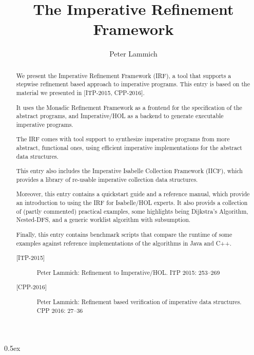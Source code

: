 \documentclass[11pt,a4paper]{report}
\begin{document}
\title{The Imperative Refinement Framework} 

\author{Peter Lammich}
\maketitle

\begin{abstract}
  We present the Imperative Refinement Framework (IRF), a tool that supports a
  stepwise refinement based approach to imperative programs. This entry is
  based on the material we presented in [ITP-2015, CPP-2016].

  It uses the Monadic Refinement Framework as a frontend for the specification of 
  the abstract programs, and Imperative/HOL as a backend to generate executable 
  imperative programs. 

  The IRF comes with tool support to synthesize 
  imperative programs from more abstract, functional ones, using efficient 
  imperative implementations for the abstract data structures.

  This entry also includes the Imperative Isabelle Collection Framework (IICF), which 
  provides a library of re-usable imperative collection data structures.

  Moreover, this entry contains a quickstart guide and a reference manual, which provide
  an introduction to using the IRF for Isabelle/HOL experts. 
  It also provids a collection of (partly commented) practical examples,
  some highlights being Dijkstra's Algorithm, Nested-DFS, and a generic worklist algorithm 
  with subsumption.

  Finally, this entry contains benchmark scripts that compare the runtime of some examples
  against reference implementations of the algorithms in Java and C++. 
  
  
  \vfill
  {\footnotesize
  \begin{description}
  \item[{[{ITP-2015}]}] Peter Lammich: Refinement to Imperative/HOL. ITP 2015: 253--269
  \item[{[{CPP-2016}]}] Peter Lammich: Refinement based verification of imperative data structures. CPP 2016: 27--36
  \end{description}
  }

\end{abstract}

\clearpage

\tableofcontents

\clearpage

\parindent 0pt\parskip 0.5ex



%
%
\end{document}
